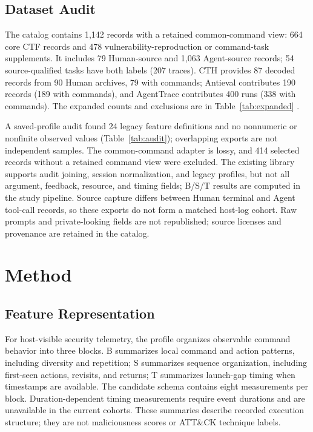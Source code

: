 \documentclass[10pt]{article}
\begin{document}
\subsection{Dataset Audit}
\label{sec:corpus}
The catalog contains 1,142 records with a retained common-command view: 664 core CTF records and 478 vulnerability-reproduction or command-task supplements. It includes 79 Human-source and 1,063 Agent-source records; 54 source-qualified tasks have both labels (207 traces). CTH provides 87 decoded records from 90 Human archives, 79 with commands; Antieval contributes 190 records (189 with commands), and AgentTrace contributes 400 runs (338 with commands). The expanded counts and exclusions are in Table~\ref{tab:expanded} \cite{cth,hfcybench,agenttracedata}.

A saved-profile audit found 24 legacy feature definitions and no nonnumeric or nonfinite observed values (Table~\ref{tab:audit}); overlapping exports are not independent samples. The common-command adapter is lossy, and 414 selected records without a retained command view were excluded. The existing library supports audit joining, session normalization, and legacy profiles, but not all argument, feedback, resource, and timing fields; B/S/T results are computed in the study pipeline. Source capture differs between Human terminal and Agent tool-call records, so these exports do not form a matched host-log cohort. Raw prompts and private-looking fields are not republished; source licenses and provenance are retained in the catalog.

\section{Method}
\subsection{Feature Representation}
For host-visible security telemetry, the profile organizes observable command behavior into three blocks. B summarizes local command and action patterns, including diversity and repetition; S summarizes sequence organization, including first-seen actions, revisits, and returns; T summarizes launch-gap timing when timestamps are available. The candidate schema contains eight measurements per block. Duration-dependent timing measurements require event durations and are unavailable in the current cohorts. These summaries describe recorded execution structure; they are not maliciousness scores or ATT\&CK technique labels.
\end{document}

